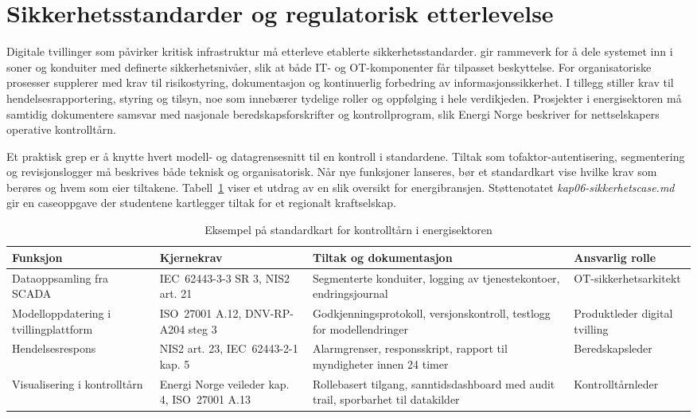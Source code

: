 \section{Sikkerhetsstandarder og regulatorisk etterlevelse}
Digitale tvillinger som påvirker kritisk infrastruktur må etterleve etablerte sikkerhetsstandarder. \citet{iec62443-2-1} gir rammeverk for å dele systemet inn i soner og konduiter med definerte sikkerhetsnivåer, slik at både IT- og OT-komponenter får tilpasset beskyttelse. For organisatoriske prosesser supplerer \citet{iso27001-2022} med krav til risikostyring, dokumentasjon og kontinuerlig forbedring av informasjonssikkerhet. I tillegg stiller \citet{eu2022nis2} krav til hendelsesrapportering, styring og tilsyn, noe som innebærer tydelige roller og oppfølging i hele verdikjeden. Prosjekter i energisektoren må samtidig dokumentere samsvar med nasjonale beredskapsforskrifter og kontrollprogram, slik Energi Norge beskriver for nettselskapers operative kontrolltårn.\citep{energinorge2023beredskap}

Et praktisk grep er å knytte hvert modell- og datagrensesnitt til en kontroll i standardene. Tiltak som tofaktor-autentisering, segmentering og revisjonslogger må beskrives både teknisk og organisatorisk. Når nye funksjoner lanseres, bør et standardkart vise hvilke krav som berøres og hvem som eier tiltakene. Tabell~\ref{tab:standardkart} viser et utdrag av en slik oversikt for energibransjen. Støttenotatet \textit{kap06-sikkerhetscase.md} gir en caseoppgave der studentene kartlegger tiltak for et regionalt kraftselskap.

\begin{table}[ht]
    \centering
    \caption{Eksempel på standardkart for kontrolltårn i energisektoren}
    \label{tab:standardkart}
    \begin{tabular}{|p{3.2cm}|p{4.6cm}|p{4.6cm}|p{3.2cm}|}
        \hline
        \textbf{Funksjon} & \textbf{Kjernekrav} & \textbf{Tiltak og dokumentasjon} & \textbf{Ansvarlig rolle} \\
        \hline
        Dataoppsamling fra SCADA & IEC~62443-3-3 SR 3, NIS2 art. 21 & Segmenterte konduiter, logging av tjenestekontoer, endringsjournal & OT-sikkerhetsarkitekt \\
        \hline
        Modelloppdatering i tvillingplattform & ISO~27001 A.12, DNV-RP-A204 steg 3 & Godkjenningsprotokoll, versjonskontroll, testlogg for modellendringer & Produktleder digital tvilling \\
        \hline
        Hendelsesrespons & NIS2 art. 23, IEC~62443-2-1 kap. 5 & Alarmgrenser, responsskript, rapport til myndigheter innen 24 timer & Beredskapsleder \\
        \hline
        Visualisering i kontrolltårn & Energi Norge veileder kap. 4, ISO~27001 A.13 & Rollebasert tilgang, sanntidsdashboard med audit trail, sporbarhet til datakilder & Kontrolltårnleder \\
        \hline
    \end{tabular}
\end{table}

